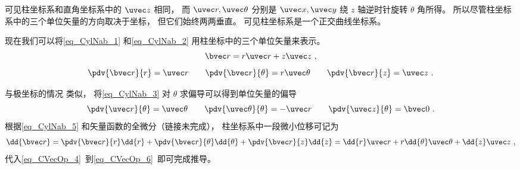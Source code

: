 可见柱坐标系和直角坐标系中的 $\uvec z$ 相同， 而 $\uvec r, \uvec \theta$ 分别是 $\uvec x, \uvec y$ 绕 $z$ 轴逆时针旋转 $\theta$ 角所得。 所以尽管柱坐标系中的三个单位矢量的方向取决于坐标， 但它们始终两两垂直。 可见柱坐标系是一个正交曲线坐标系。

现在我们可以将\autoref{eq_CylNab_1} 和\autoref{eq_CylNab_2} 用柱坐标中的三个单位矢量来表示。
\begin{equation}
\bvec r = r\uvec r + z\uvec z~,
\end{equation}
\begin{equation}\label{eq_CylNab_5}
\pdv{\bvec r}{r} = \uvec r \qquad \pdv{\bvec r}{\theta} = r\uvec \theta \qquad \pdv{\bvec r}{z} = \uvec z~.
\end{equation}

与极坐标的情况 类似， 将\autoref{eq_CylNab_3} 对 $\theta$ 求偏导可以得到单位矢量的偏导
\begin{equation}
\pdv{\uvec r}{\theta} = \uvec \theta \qquad
\pdv{\uvec \theta}{\theta} = -\uvec r \qquad
\pdv{\uvec z}{\theta} = \bvec 0~.
\end{equation}
根据\autoref{eq_CylNab_5} 和矢量函数的全微分（链接未完成）， 柱坐标系中一段微小位移可记为
\begin{equation}\label{eq_CylNab_7}
\dd{\bvec r} = \pdv{\bvec r}{r}\dd{r} + \pdv{\bvec r}{\theta}\dd{\theta} + \pdv{\bvec r}{z}\dd{z} = \dd{r}\uvec r + r\dd{\theta} \uvec \theta + \dd{z} \uvec z~,
\end{equation}
代入\autoref{eq_CVecOp_4}~到\autoref{eq_CVecOp_6}~即可完成推导。
